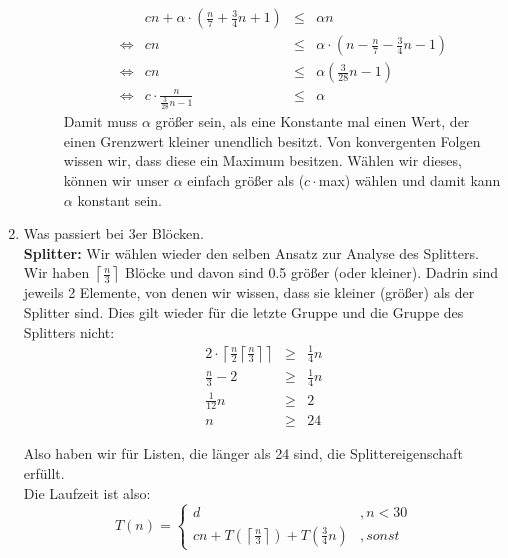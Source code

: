 \documentclass[11pt,a4paper,ngerman]{article}
\begin{document}
\begin{enumerate}[\bfseries (a)]
\begin{description}
$$
\begin{array}{crcl}
& cn + \alpha \cdot \left( \frac{n}{7} + \frac{3}{4}n + 1 \right) &\leq& \alpha n\\
\Leftrightarrow & cn & \leq & \alpha \cdot \left( n - \frac{n}{7} - \frac{3}{4}n - 1 \right)\\
\Leftrightarrow& cn &\leq& \alpha \left( \frac{3}{28}n - 1 \right)\\
\Leftrightarrow& c \cdot \frac{n}{\frac{3}{28}n - 1} &\leq& \alpha
\end{array}
$$
Damit muss $\alpha$ größer sein, als eine Konstante mal einen Wert, der einen Grenzwert kleiner unendlich besitzt. Von konvergenten Folgen wissen wir, dass diese ein Maximum besitzen. Wählen wir dieses, können wir unser $\alpha$ einfach größer als ($c\cdot $max) wählen und damit kann $\alpha$ konstant sein.

\end{description}

\pagebreak

\item Was passiert bei 3er Blöcken.\\

\textbf{Splitter:} Wir wählen wieder den selben Ansatz zur Analyse des Splitters. Wir haben $\left\lceil \frac{n}{3} \right\rceil$ Blöcke und davon sind 0.5 größer (oder kleiner). Dadrin sind jeweils 2 Elemente, von denen wir wissen, dass sie kleiner (größer) als der Splitter sind. Dies gilt wieder für die letzte Gruppe und die Gruppe des Splitters nicht:\\

$$
\begin{array}{rcl}
2 \cdot \left\lceil \frac{n}{2} \left\lceil \frac{n}{3} \right\rceil \right\rceil &\geq& \frac{1}{4} n\\
\frac{n}{3} - 2&\geq& \frac{1}{4} n\\
\frac{1}{12}n &\geq& 2\\
n &\geq& 24
\end{array}
$$

Also haben wir für Listen, die länger als 24 sind, die Splittereigenschaft erfüllt.\\
Die Laufzeit ist also:
$$
T(n) = \left\{
\begin{array}{lr}
d &, n<30\\
c n+ T \left(\left\lceil \frac{n}{3} \right\rceil \right) + T \left( \frac{3}{4}n \right) &,sonst
\end{array}\right.
$$

\begin{description}


\end{description}
\end{enumerate}
\end{document}
